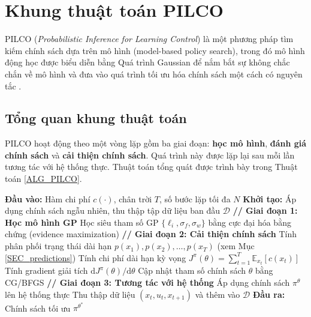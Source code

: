 \section{Khung thuật toán PILCO}
\label{SEC_pilco}

PILCO (\textit{Probabilistic Inference for Learning Control}) là một phương pháp tìm kiếm chính sách dựa trên mô hình (model-based policy search), trong đó mô hình động học được biểu diễn bằng Quá trình Gaussian để nắm bắt sự không chắc chắn về mô hình và đưa vào quá trình tối ưu hóa chính sách một cách có nguyên tắc \cite{Deisenroth_2015}.

\subsection{Tổng quan khung thuật toán}
\label{SUB_SEC_pilco_overview}

PILCO hoạt động theo một vòng lặp gồm ba giai đoạn: \textbf{học mô hình}, \textbf{đánh giá chính sách} và \textbf{cải thiện chính sách}. Quá trình này được lặp lại sau mỗi lần tương tác với hệ thống thực. Thuật toán tổng quát được trình bày trong Thuật toán \ref{ALG_PILCO}.

\begin{algorithm}[H]
\caption{PILCO: Probabilistic Inference for Learning Control}
\label{ALG_PILCO}
\begin{algorithmic}[1]
    \State \textbf{Đầu vào:} Hàm chi phí $c(\cdot)$, chân trời $T$, số bước lặp tối đa $N$
    \State \textbf{Khởi tạo:} Áp dụng chính sách ngẫu nhiên, thu thập tập dữ liệu ban đầu $\mathcal{D}$
        \State \textbf{// Giai đoạn 1: Học mô hình GP}
        \State Học siêu tham số GP $\{\ell_i, \sigma_f, \sigma_w\}$ bằng cực đại hóa bằng chứng (evidence maximization)
        \State \textbf{// Giai đoạn 2: Cải thiện chính sách}
        \Repeat
            \State Tính phân phối trạng thái dài hạn $p(x_1), p(x_2), \dots, p(x_T)$ (xem Mục \ref{SEC_predictions})
            \State Tính chi phí dài hạn kỳ vọng $J^\pi(\theta) = \sum_{t=1}^{T} \mathbb{E}_{x_t}[c(x_t)]$
            \State Tính gradient giải tích $\mathrm{d}J^\pi(\theta)/\mathrm{d}\theta$
            \State Cập nhật tham số chính sách $\theta$ bằng CG/BFGS
        \State \textbf{// Giai đoạn 3: Tương tác với hệ thống}
        \State Áp dụng chính sách $\pi^\theta$ lên hệ thống thực
        \State Thu thập dữ liệu $(x_t, u_t, x_{t+1})$ và thêm vào $\mathcal{D}$
    \EndFor
    \State \textbf{Đầu ra:} Chính sách tối ưu $\pi^{\theta^*}$
\end{algorithmic}
\end{algorithm}


